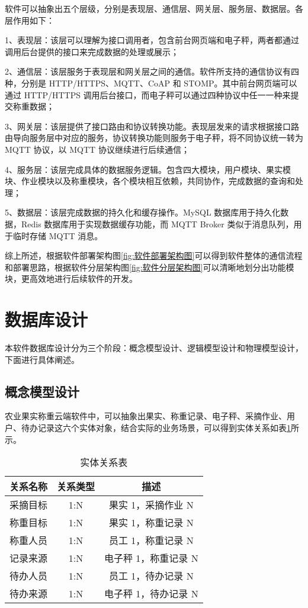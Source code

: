 软件可以抽象出五个层级，分别是表现层、通信层、网关层、服务层、数据层。各层作用如下：

1、表现层：该层可以理解为接口调用者，包含前台网页端和电子秤，两者都通过调用后台提供的接口来完成数据的处理或展示；

2、通信层：该层服务于表现层和网关层之间的通信。软件所支持的通信协议有四种，分别是 HTTP/HTTPS、MQTT、CoAP 和 STOMP。其中前台网页端可以通过 HTTP/HTTPS 调用后台接口，而电子秤可以通过四种协议中任一一种来提交称重数据；

3、网关层：该层提供了接口路由和协议转换功能。表现层发来的请求根据接口路由导向服务层中对应的服务，协议转换功能则服务于电子秤，将不同协议统一转为 MQTT 协议，以 MQTT 协议继续进行后续通信；

4、服务层：该层完成具体的数据服务逻辑。包含四大模块，用户模块、果实模块、作业模块以及称重模块，各个模块相互依赖，共同协作，完成数据的查询和处理；

5、数据层：该层完成数据的持久化和缓存操作。MySQL 数据库用于持久化数据，Redis 数据库用于实现数据缓存功能，而 MQTT Broker 类似于消息队列，用于临时存储 MQTT 消息。

综上所述，根据软件部署架构图\ref{fig:软件部署架构图}可以得到软件整体的通信流程和部署思路，根据软件分层架构图\ref{fig:软件分层架构图}可以清晰地划分出功能模块，更高效地进行后续软件的开发。

\section{数据库设计}\label{sec:database}

本软件数据库设计分为三个阶段：概念模型设计、逻辑模型设计和物理模型设计，下面进行具体阐述。

\subsection{概念模型设计}

农业果实称重云端软件中，可以抽象出果实、称重记录、电子秤、采摘作业、用户、待办记录这六个实体对象，结合实际的业务场景，可以得到实体关系如表\ref{tab:ertab}所示。

\begin{table}[H]
\centering
\caption{实体关系表}
\label{tab:ertab}
\begin{tabular}{|c|c|c|}
\hline
关系名称 & 关系类型 & 描述 \\ \hline

采摘目标 & 1:N & 果实 1，采摘作业 N \\ \hline

称重目标 & 1:N & 果实 1，称重记录 N \\ \hline

称重人员 & 1:N & 员工 1，称重记录 N  \\ \hline

记录来源 & 1:N & 电子秤 1，称重记录 N \\ \hline

待办人员 & 1:N & 员工 1，待办记录 N \\ \hline

待办来源 & 1:N & 电子秤 1，待办记录 N \\ \hline

\end{tabular}%
\end{table}

